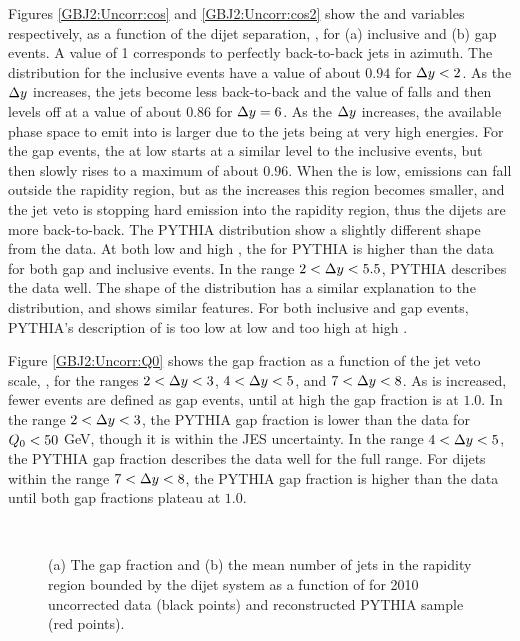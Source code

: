 Figures \ref{GBJ2:Uncorr:cos} and \ref{GBJ2:Uncorr:cos2} show the \mean{\cosdphi{}} and \mean{\costwodphi{}} variables respectively, as a function of the dijet separation, \dy{}, for (a) inclusive and (b) gap events.
A \mean{\cosdphi{}} value of 1 corresponds to perfectly back-to-back jets in azimuth.
The \mean{\cosdphi{}} distribution for the inclusive events have a value of about $0.94$ for $\mbox{$\Delta y$}{}<2$.
As the $\mbox{$\Delta y$}{}$ increases, the jets become less back-to-back and the value of \mean{\cosdphi{}} falls and then levels off at a value of about $0.86$ for $\mbox{$\Delta y$}{}=6$.
As the $\mbox{$\Delta y$}{}$ increases, the available phase space to emit into is larger due to the jets being at very high energies.
For the gap events, the \mean{\cosdphi{}} at low \dy{} starts at a similar level to the inclusive events, but then slowly rises to a maximum of about $0.96$.
When the \dy{} is low, emissions can fall outside the rapidity region, but as the \dy{} increases this region becomes smaller, and the jet veto is stopping hard emission into the rapidity region, thus the dijets are more back-to-back.
The PYTHIA distribution show a slightly different shape from the data.
At both low and high \dy{}, the \mean{\cosdphi{}} for PYTHIA is higher than the data for both gap and inclusive events. 
In the range $2<\mbox{$\Delta y$}{}<5.5$, PYTHIA describes the data well.
The shape of the \mean{\costwodphi{}} distribution has a similar explanation to the \mean{\cosdphi{}} distribution, and shows similar features.
For both inclusive and gap events, PYTHIA's description of \mean{\costwodphi{}} is too low at low \dy{} and too high at high \dy{}.

Figure \ref{GBJ2:Uncorr:Q0} shows the gap fraction as a function of the jet veto scale, \qz{}, for the \dy{} ranges $2<\mbox{$\Delta y$}{}<3$, $4<\mbox{$\Delta y$}{}<5$, and $7<\mbox{$\Delta y$}{}<8$.
As \qz{} is increased, fewer events are defined as gap events, until at high \qz{} the gap fraction is at $1.0$.
In the range $2<\mbox{$\Delta y$}{}<3$, the PYTHIA gap fraction is lower than the data for $\mbox{$Q_0$}{}<50$ GeV, though it is within the JES uncertainty.
In the range $4<\mbox{$\Delta y$}{}<5$, the PYTHIA gap fraction describes the data well for the full \qz{} range.
For dijets within the range $7<\mbox{$\Delta y$}{}<8$, the PYTHIA gap fraction is higher than the data until both gap fractions plateau at $1.0$.

\begin{figure}
\centering
\mbox{
              \quad
              \quad
                              }
\caption[Comparison of the data and PYTHIA for the gap fraction and mean number of jets]{
(a) The gap fraction  and (b) the mean number of jets in the rapidity region bounded by the dijet system as a function of \dy{} for 2010 uncorrected data (black points) and reconstructed PYTHIA sample (red points).
\label{GBJ2:Uncorr:Incl_Gap}}
\end{figure}



